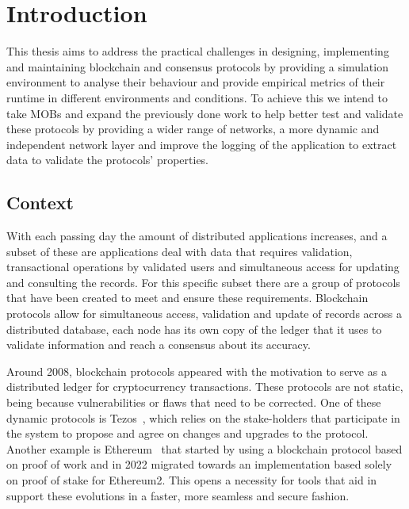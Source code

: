 
%

\chapter{Introduction}\label{cha:introduction}

This thesis aims to address the practical challenges in designing, implementing and maintaining blockchain and consensus
protocols by providing a simulation environment to analyse their behaviour and provide empirical metrics of their runtime in
different environments and conditions. To achieve this we intend to take MOBs and expand
the previously done work to help better test and validate these protocols by providing a wider range of networks,
a more dynamic and independent network layer and improve the logging of the application to extract data to validate the
protocols' properties.


\section{Context}\label{sub:context}
With each passing day the amount of distributed applications increases, and a subset of these are applications
deal with data that requires validation, transactional operations by validated users and simultaneous access for updating and
consulting the records. For this specific subset there are a group of protocols that have been created to meet and ensure
these requirements. Blockchain protocols allow for simultaneous access, validation and update of records across
a distributed database, each node has its own copy of the ledger that it uses to validate information and reach a consensus
about its accuracy.

Around 2008, blockchain protocols appeared with the motivation
to serve as a distributed ledger for cryptocurrency transactions. These protocols are not static, being because vulnerabilities 
or flaws that need to be corrected.
One of these dynamic protocols is Tezos~\cite{tezos}, which relies on the stake-holders that participate in the system to propose and
agree on changes and upgrades to the protocol. Another example is Ethereum~\cite{ethereum} that started by using a blockchain protocol based on proof
of work and in 2022 migrated towards an implementation based solely on proof of stake for Ethereum2.
This opens a necessity for tools that aid in support these evolutions in a faster, more seamless and secure fashion.

